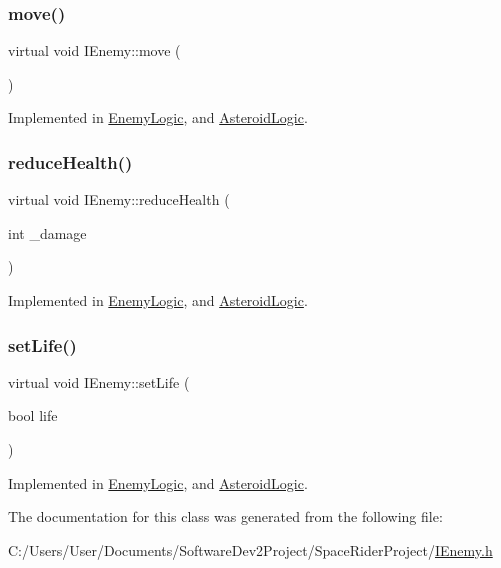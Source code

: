 \subsubsection{\texorpdfstring{move()}{move()}}
{\footnotesize\ttfamily virtual void I\+Enemy\+::move (\begin{DoxyParamCaption}{ }\end{DoxyParamCaption})\hspace{0.3cm}{\ttfamily [pure virtual]}}



Implemented in \hyperlink{class_enemy_logic_a2bc8ba642d677ab31f4b54ec00299e25}{Enemy\+Logic}, and \hyperlink{class_asteroid_logic_af20b202c4f5857279192733a0b2fdbd3}{Asteroid\+Logic}.

\mbox{\label{class_i_enemy_acbc451cafee99cb405d9d9248820b6ea}} 
\subsubsection{\texorpdfstring{reduce\+Health()}{reduceHealth()}}
{\footnotesize\ttfamily virtual void I\+Enemy\+::reduce\+Health (\begin{DoxyParamCaption}\item[{int}]{\+\_\+damage }\end{DoxyParamCaption})\hspace{0.3cm}{\ttfamily [pure virtual]}}



Implemented in \hyperlink{class_enemy_logic_aaf2f8ff785c8f7410e04cfb3cb192b9b}{Enemy\+Logic}, and \hyperlink{class_asteroid_logic_a54519e4b2719c70d17f5a28bb0d8fb56}{Asteroid\+Logic}.

\mbox{\label{class_i_enemy_ab58f2f6c2a8c08730aaf8771f088e1bf}} 
\subsubsection{\texorpdfstring{set\+Life()}{setLife()}}
{\footnotesize\ttfamily virtual void I\+Enemy\+::set\+Life (\begin{DoxyParamCaption}\item[{bool}]{life }\end{DoxyParamCaption})\hspace{0.3cm}{\ttfamily [pure virtual]}}



Implemented in \hyperlink{class_enemy_logic_a12bce0a6b6cad1af96aee3b401ea2c45}{Enemy\+Logic}, and \hyperlink{class_asteroid_logic_a594dc710574cac901e9999474b9379fe}{Asteroid\+Logic}.



The documentation for this class was generated from the following file\+:\begin{DoxyCompactItemize}
\item 
C\+:/\+Users/\+User/\+Documents/\+Software\+Dev2\+Project/\+Space\+Rider\+Project/\hyperlink{_i_enemy_8h}{I\+Enemy.\+h}\end{DoxyCompactItemize}
